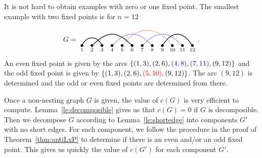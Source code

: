 \documentclass[ALCO,ThmDefs,Unicode,epreuves]{cedram}
\newcommand{\blue}[1]{\textcolor{blue}{#1}}
\newcommand{\red}[1]{\textcolor{red}{#1}}
\newcommand{\blueun}[1]{\textcolor{blue}{#1}}
\newcommand{\redun}[1]{\textcolor{red}{#1}}
\begin{document}
\begin{exam} It is not hard to obtain examples with zero or one fixed point. The smallest example with two fixed points is for $n=12$
\begin{equation}
G=
\begin{tikzpicture}[baseline=.2cm]
	\foreach \x in {1,2,3,4,5,6,7,8,9,10,11,12} 
		\node (\x) at (\x/2,0) [inner sep=-1pt] {$\bullet$};
	\node at (1/2,-.2) {$\scriptstyle 1$};
	\node at (2/2,-.2) {$\scriptstyle 2$};	
	\node at (3/2,-.2) {$\scriptstyle 3$};
	\node at (4/2,-.2) {$\scriptstyle 4$};	
	\node at (5/2,-.2) {$\scriptstyle 5$};
	\node at (6/2,-.2) {$\scriptstyle 6$};	
	\node at (7/2,-.2) {$\scriptstyle 7$};
	\node at (8/2,-.2) {$\scriptstyle 8$};	
	\node at (9/2,-.2) {$\scriptstyle 9$};
	\node at (10/2,-.2) {$\scriptstyle 10$};	
	\node at (11/2,-.2) {$\scriptstyle 11$};
	\node at (12/2,-.2) {$\scriptstyle 12$};	
	\draw [thick] (1) .. controls (1.5/2,.5) and (2.5/2,.5) .. (3); 
	\draw [thick] (2) .. controls (3.5/2,.75) and (4.5/2,.75) .. (6); 
	\blue{\draw [densely dotted,thick] (4) .. controls (5.5/2,.75) and (6.5/2,.75) .. (8); 
	\draw [densely dotted,thick] (7) .. controls (8.5/2,.75) and (9.5/2,.75) .. (11); }
	\red{\draw [dotted,thick] (5) .. controls (6.5/2,1) and (8.5/2,1) .. (10); }
	\draw [thick] (9) .. controls (10/2,.75) and (11/2,.75) .. (12); 
\end{tikzpicture}.
 \end{equation}
An even fixed point is given by the arcs $\{(1,3),(2,6),\blueun{(4,8)},\blueun{(7,11)},(9,12)\}$ and the odd fixed point is given by $\{(1,3),(2,6),\redun{(5,10)},(9,12)\}$.
The arc $(9,12)$ is determined and the odd or even fixed points are determined from there.
\end{exam}


\begin{rema}\label{rem:coefcomp} 
Once a non-nesting graph $G$ is given, the value of $c(G)$ is very efficient to compute. Lemma~\ref{le:decomposible} gives us that $c(G)=0$ if $G$ is decomposible. Then we decompose 
$G$ according to Lemma~\ref{le:shortedge} into components $G'$ with no short edges. For each component, we follow the procedure in the proof of Theorem~\ref{thm:antiLxP} to determine if there is
an even and/or an odd fixed point. This gives us quickly the value of $c(G')$ for each component $G'$.
\end{rema}
\end{document}
